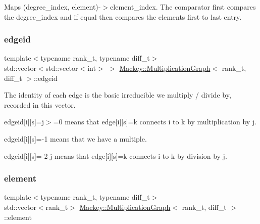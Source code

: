 Maps (degree\+\_\+index, element)-\/$>$element\+\_\+index. The comparator first compares the degree\+\_\+index and if equal then compares the elements first to last entry. 

\mbox{\label{classMackey_1_1MultiplicationGraph_aa0eb04947f664262233ed4cdf650371b}} 
\subsubsection{\texorpdfstring{edgeid}{edgeid}}
{\footnotesize\ttfamily template$<$typename rank\+\_\+t, typename diff\+\_\+t$>$ \\
std\+::vector$<$std\+::vector$<$int$>$ $>$ \hyperlink{classMackey_1_1MultiplicationGraph}{Mackey\+::\+Multiplication\+Graph}$<$ rank\+\_\+t, diff\+\_\+t $>$\+::edgeid}



The identity of each edge is the basic irreducible we multiply / divide by, recorded in this vector. 

edgeid\mbox{[}i\mbox{]}\mbox{[}s\mbox{]}=j$>$=0 means that edge\mbox{[}i\mbox{]}\mbox{[}s\mbox{]}=k connects i to k by multiplication by j.

edgeid\mbox{[}i\mbox{]}\mbox{[}s\mbox{]}=-\/1 means that we have a multiple.

edgeid\mbox{[}i\mbox{]}\mbox{[}s\mbox{]}=-\/2-\/j means that edge\mbox{[}i\mbox{]}\mbox{[}s\mbox{]}=k connects i to k by division by j. \mbox{\label{classMackey_1_1MultiplicationGraph_a53fe65317d8cef485a93e3e516dd374f}} 
\subsubsection{\texorpdfstring{element}{element}}
{\footnotesize\ttfamily template$<$typename rank\+\_\+t, typename diff\+\_\+t$>$ \\
std\+::vector$<$rank\+\_\+t$>$ \hyperlink{classMackey_1_1MultiplicationGraph}{Mackey\+::\+Multiplication\+Graph}$<$ rank\+\_\+t, diff\+\_\+t $>$\+::element\hspace{0.3cm}{\ttfamily [protected]}}



